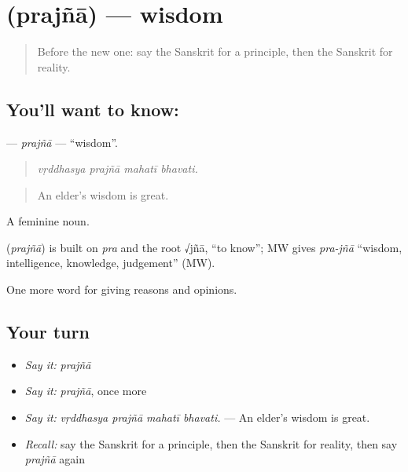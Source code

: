 \section[\texorpdfstring{\sk{प्रज्ञा} (prajñā)}{प्रज्ञा (prajñā)}]{ (prajñā) — wisdom}

\label{lesson:SA-C365-prajna}



\begin{quote}
Before the new one: say the Sanskrit for a principle, then the Sanskrit for reality.
\end{quote}

\subsection*{You'll want to know: }
\textbf{} — \emph{prajñā} — \textquotedblleft{}wisdom\textquotedblright{}.

\begin{quote}
   
\end{quote}

\begin{quote}
\emph{vṛddhasya prajñā mahatī bhavati.}
\end{quote}

\begin{quote}
An elder's wisdom is great.
\end{quote}

A feminine noun.

\begin{cousinweb}
\textbf{} (\emph{prajñā}) is built on \emph{pra} and the root √jñā, \textquotedblleft{}to know\textquotedblright{}; MW gives \emph{pra-jñā} \textquotedblleft{}wisdom, intelligence, knowledge, judgement\textquotedblright{} (MW).
\end{cousinweb}

\begin{grammarlens}[title={What you've built}]
One more word for giving reasons and opinions.
\end{grammarlens}

\subsection*{Your turn}
\begin{itemize}
\raggedright
  \item \emph{Say it:} \emph{prajñā}
  \item \emph{Say it:} \emph{prajñā}, once more
  \item \emph{Say it:} \emph{vṛddhasya prajñā mahatī bhavati.} — An elder's wisdom is great.
  \item \emph{Recall:} say the Sanskrit for a principle, then the Sanskrit for reality, then say \emph{prajñā} again
\end{itemize}

